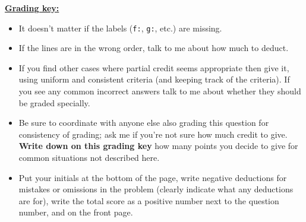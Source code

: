 \documentclass[11pt,fleqn]{article}
\begin{document}
\begin{enumerate}
\begin{multicols}{2}
\begin{info}{\textbf{\underline{Grading key:}}}
\begin{itemize}
              \item It doesn't matter if the labels (\texttt{f:},
                     \texttt{g:}, etc.) are missing.

              \item If the lines are in the wrong order, talk to me about
                    how much to deduct.

              \item If you find other cases where partial credit seems
                    appropriate then give it, using uniform and consistent
                    criteria (and keeping track of the criteria).  If you
                    see any common incorrect answers talk to me about
                    whether they should be graded specially.

              \item Be sure to coordinate with anyone else also grading this
                    question for consistency of grading; ask me if you're
                    not sure how much credit to give.  \textbf{Write down on
                    this grading key} how many points you decide to give
                    for common situations not described here.

              \item Put your initials at the bottom of the page, write
                    negative deductions for mistakes or omissions in the
                    problem (clearly indicate what any deductions are for),
                    write the total score as a positive number next to the
                    question number, and on the front page.

            \end{itemize}

          \end{info}

    \end{multicols}

  \end{enumerate}
\end{document}
